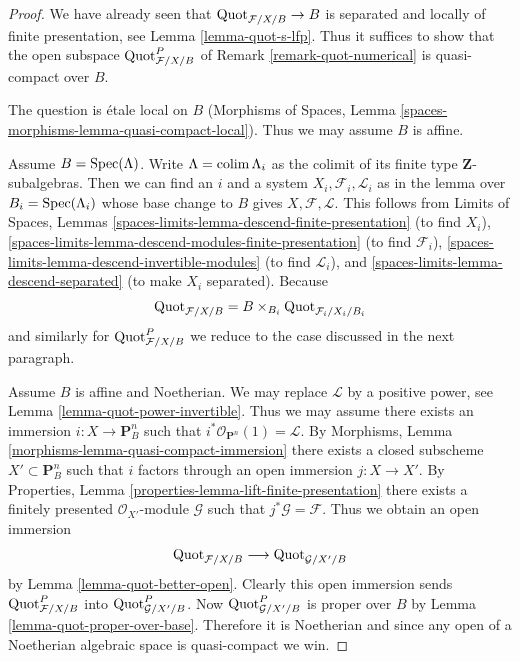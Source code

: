 \begin{proof}
We have already seen that $\mathrm{Quot}_{\mathcal{F}/X/B} \to B$
is separated and locally of finite presentation, see
Lemma \ref{lemma-quot-s-lfp}. Thus it suffices to show that
the open subspace $\mathrm{Quot}^P_{\mathcal{F}/X/B}$
of Remark \ref{remark-quot-numerical} is quasi-compact over $B$.

\medskip\noindent
The question is \'etale local on $B$
(Morphisms of Spaces, Lemma \ref{spaces-morphisms-lemma-quasi-compact-local}).
Thus we may assume $B$ is affine.

\medskip\noindent
Assume $B = \mathop{\mathrm{Spec}}(\Lambda)$. Write $\Lambda = \mathop{\mathrm{colim}}\nolimits \Lambda_i$ as the
colimit of its finite type $\mathbf{Z}$-subalgebras. Then
we can find an $i$ and a system $X_i, \mathcal{F}_i, \mathcal{L}_i$
as in the lemma over $B_i = \mathop{\mathrm{Spec}}(\Lambda_i)$ whose base change to
$B$ gives $X, \mathcal{F}, \mathcal{L}$.
This follows from
Limits of Spaces, Lemmas
\ref{spaces-limits-lemma-descend-finite-presentation} (to find $X_i$),
\ref{spaces-limits-lemma-descend-modules-finite-presentation} (to find
$\mathcal{F}_i$), \ref{spaces-limits-lemma-descend-invertible-modules}
(to find $\mathcal{L}_i$), and \ref{spaces-limits-lemma-descend-separated}
(to make $X_i$ separated). Because
$$
\mathrm{Quot}_{\mathcal{F}/X/B} = B \times_{B_i}
\mathrm{Quot}_{\mathcal{F}_i/X_i/B_i}
$$
and similarly for $\mathrm{Quot}^P_{\mathcal{F}/X/B}$ we reduce
to the case discussed in the next paragraph.

\medskip\noindent
Assume $B$ is affine and Noetherian. We may replace $\mathcal{L}$
by a positive power, see Lemma \ref{lemma-quot-power-invertible}.
Thus we may assume there exists an immersion $i : X \to \mathbf{P}^n_B$
such that $i^*\mathcal{O}_{\mathbf{P}^n}(1) = \mathcal{L}$. By
Morphisms, Lemma \ref{morphisms-lemma-quasi-compact-immersion}
there exists a closed subscheme $X' \subset \mathbf{P}^n_B$
such that $i$ factors through an open immersion $j : X \to X'$.
By Properties, Lemma \ref{properties-lemma-lift-finite-presentation}
there exists a finitely presented $\mathcal{O}_{X'}$-module
$\mathcal{G}$ such that $j^*\mathcal{G} = \mathcal{F}$.
Thus we obtain an open immersion
$$
\mathrm{Quot}_{\mathcal{F}/X/B}
\longrightarrow
\mathrm{Quot}_{\mathcal{G}/X'/B}
$$
by Lemma \ref{lemma-quot-better-open}. Clearly this open immersion
sends $\mathrm{Quot}^P_{\mathcal{F}/X/B}$ into
$\mathrm{Quot}^P_{\mathcal{G}/X'/B}$. Now
$\mathrm{Quot}^P_{\mathcal{G}/X'/B}$ is proper over $B$ by
Lemma \ref{lemma-quot-proper-over-base}.
Therefore it is Noetherian and since any open of a Noetherian
algebraic space is quasi-compact we win.
\end{proof}




